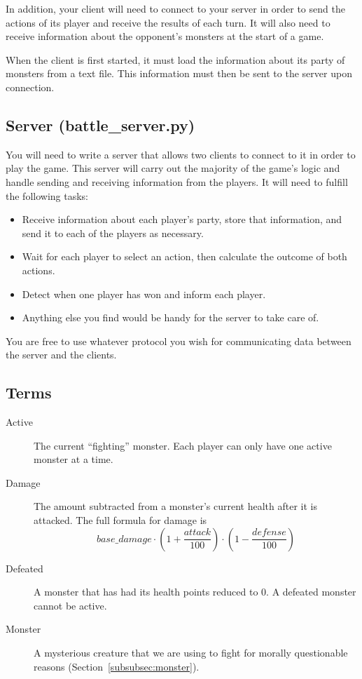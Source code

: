 \documentclass[11pt]{cselabheader}
\begin{document}
In addition, your client will need to connect to your server in order to send the
actions of its player and receive the results of each turn. It will also need to
receive information about the opponent's monsters at the start of a game.

When the client is first started, it must load the information about its party
of monsters from a text file. This information must then be sent to the server upon
connection.

\subsection{Server (battle\_server.py)}
You will need to write a server that allows two clients to connect to it in
order to play the game. This server will carry out the majority of the game's
logic and handle sending and receiving information from the players. It will
need to fulfill the following tasks:

\begin{itemize}
\item Receive information about each player's party, store that information, and
  send it to each of the players as necessary.
\item Wait for each player to select an action, then calculate the outcome of
  both actions.
\item Detect when one player has won and inform each player.
\item Anything else you find would be handy for the server to take care of.
\end{itemize}

You are free to use whatever protocol you wish for communicating data between
the server and the clients.

\subsection{Terms}

\begin{description}
\item[Active] The current ``fighting'' monster. Each player can only have one
  active monster at a time.
\item[Damage] The amount subtracted from a monster's current health after it is
  attacked. The full formula for damage is $$base\_damage \cdot \left(1 +
  \frac{attack}{100}\right) \cdot \left(1 - \frac{defense}{100}\right)$$
\item[Defeated] A monster that has had its health points reduced to 0. A
  defeated monster cannot be active.
\item[Monster] A mysterious creature that we are using to fight for morally
  questionable reasons (Section~\ref{subsubsec:monster}).
\end{description}
\end{document}
